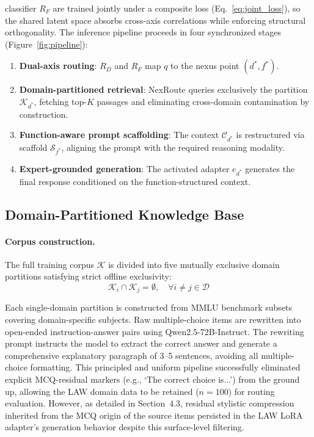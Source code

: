 \documentclass[a4paper,fleql]{cas-sc}
\begin{document}
classifier $R_F$ are trained jointly under a composite loss
(Eq.~\ref{eq:joint_loss}), so the shared latent space absorbs cross-axis
correlations while enforcing structural orthogonality.
The inference pipeline proceeds in four synchronized stages
(Figure~\ref{fig:pipeline}):
\begin{enumerate}
    \item \textbf{Dual-axis routing}: $R_D$ and $R_F$ map $q$ to the nexus
    point $(d^*, f^*)$.
    \item \textbf{Domain-partitioned retrieval}: NexRoute queries exclusively
    the partition $\mathcal{K}_{d^*}$, fetching top-$K$ passages and
    eliminating cross-domain contamination by construction.
    \item \textbf{Function-aware prompt scaffolding}: The context
    $\mathcal{C}_{d^*}$ is restructured via scaffold $\mathcal{S}_{f^*}$,
    aligning the prompt with the required reasoning modality.
    \item \textbf{Expert-grounded generation}: The activated adapter $e_{d^*}$
    generates the final response conditioned on the function-structured context.
\end{enumerate}
\subsection{Domain-Partitioned Knowledge Base}
\label{ssec:retrieval}
\paragraph{Corpus construction.}
The full training corpus $\mathcal{K}$ is divided into five mutually exclusive
domain partitions satisfying strict offline exclusivity:
\begin{equation}
    \mathcal{K}_i \cap \mathcal{K}_j = \emptyset,
    \quad \forall i \neq j \in \mathcal{D}
    \label{eq:partition}
\end{equation}

Each single-domain partition is constructed from MMLU benchmark subsets
\citep{hendrycks2021mmlu} covering domain-specific subjects. Raw
multiple-choice items are rewritten into open-ended instruction-answer pairs
using Qwen2.5-72B-Instruct. The rewriting prompt instructs the model to
extract the correct answer and generate a comprehensive explanatory paragraph
of 3--5 sentences, avoiding all multiple-choice formatting. This principled and 
uniform pipeline successfully eliminated explicit MCQ-residual markers 
(e.g., `The correct choice is...') from the ground up, allowing the LAW domain 
data to be retained ($n=100$) for routing evaluation. However, as detailed in 
Section~4.3, residual stylistic compression inherited from the MCQ origin of 
the source items persisted in the LAW LoRA adapter's generation behavior 
despite this surface-level filtering.
\end{document}
